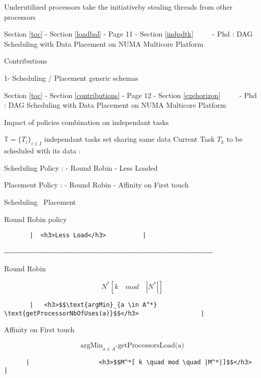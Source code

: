 \documentclass[11pt]{article}
\begin{document}
Underutilized processors take the initiativeby stealing threads from
other processors

     {Section \ref{toc} - Section \ref{loadbal} - Page 11 -
Section \ref{indpdtk} ~~~~ - Phd : DAG Scheduling with Data Placement on
NUMA Multicore Platform}

Contributions

1- Scheduling / Placement generic schemas

     {Section \ref{toc} - Section \ref{contributions} - Page 12 -
Section \ref{exehorizon} ~~~~ - Phd : DAG Scheduling with Data Placement
on NUMA Multicore Platform}

Impact of policies combination on independant tasks

\(\mathbb{T} = \{ T_i \}_{i \in I}\) independant tasks set sharing same
data Current Task \(T_k\) to be scheduled with its data :

Scheduling Policy : - Round Robin - Less Loaded

Placement Policy : - Round Robin - Affinity on First touch

\textbar{}

Scheduling ~Placement

\textbar{}

Round Robin policy

\begin{verbatim}
       |  <h3>Less Load</h3>          |
\end{verbatim}

\textbar{}-\/-\/-\/-\/-\/-\/-\/-\/-\/-\/-\/-\/-\/-\/-\/-\/-\/-\/-\/-\/-\/-\/-\/-\/-\textbar{}-\/-\/-\/-\/-\/-\/-\/-\/-\/-\/-\/-\/-\/-\/-\/-\/-\/-\/-\/-\/-\/-\/-\/-\/-\/-\/-\/-\/-\/-\/-\/-\/-\/-\/-\/-\/-\/-\/-\/-\/-\/-\textbar{}-\/-\/-\/-\/-\/-\/-\/-\/-\/-\/-\/-\/-\/-\/-\/-\/-\/-\/-\/-\/-\textbar{}
\textbar{}

Round Robin

\textbar{}

\[N^*[k \quad mod \quad |N^*|]\]

\begin{verbatim}
       |   <h3>$$\text{argMin}_{a \in A^*} \text{getProcessorNbOfUses(a)}$$</h3>                 |
\end{verbatim}

\textbar{}

Affinity on First touch

\textbar{}

\[\text{argMin}_{a \in A^*} \text{getProcessorsLoad(a)}\]

\begin{verbatim}
      |                   <h3>$$M^*[ k \quad mod \quad |M^*|]$$</h3>  |
\end{verbatim}
\end{document}
